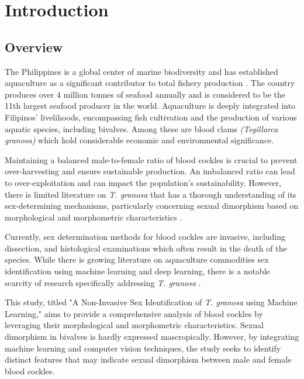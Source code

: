\chapter{Introduction}
\label{sec:researchdesc}    %

\section{Overview}
\label{sec:overview}

The Philippines is a global center of marine biodiversity and has established aquaculture as a significant contributor to total fishery production \cite{aypa2000, bfar2019}. The country produces over 4 million tonnes of seafood annually and is considered to be the 11th largest seafood producer in the world. Aquaculture is deeply integrated into Filipinos' livelihoods, encompassing fish cultivation and the production of various aquatic species, including bivalves. Among these are blood clams \textit{(Tegillarca granosa)} which hold considerable economic and environmental significance.

Maintaining a balanced male-to-female ratio of blood cockles is crucial to prevent over-harvesting and ensure sustainable production. An imbalanced ratio can lead to over-exploitation and can impact the population's sustainability. However, there is limited literature on \textit{T. granosa} that has a thorough understanding of its sex-determining mechanisms, particularly concerning sexual dimorphism based on morphological and morphometric characteristics \cite{breton2017sex}.

Currently, sex determination methods for blood cockles are invasive, including dissection, and histological examinations which often result in the death of the species. While there is growing literature on aquaculture commodities sex identification using machine learning and deep learning, there is a notable scarcity of research specifically addressing \textit{T. granosa} \cite{miranda2023}.

This study, titled "A Non-Invasive Sex Identification of \textit{T. granosa} using Machine Learning," aims to provide a comprehensive analysis of blood cockles by leveraging their morphological and morphometric characteristics. Sexual dimorphism in bivalves is hardly expressed mascropically\cite{karapunar2021}. However, by integrating machine learning and computer vision techniques, the study seeks to identify distinct features that may indicate sexual dimorphism between male and female blood cockles.


